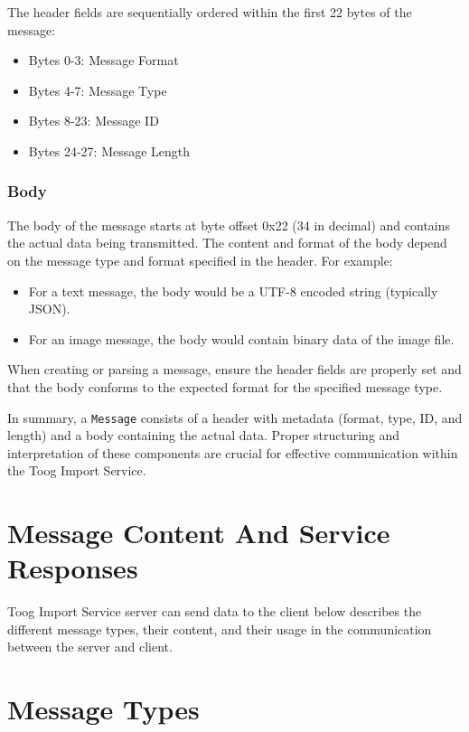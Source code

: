 \documentclass{memoir}
\begin{document}
	The header fields are sequentially ordered within the first 22 bytes of the message:
	\begin{itemize}
		\item Bytes 0-3: Message Format
		\item Bytes 4-7: Message Type
		\item Bytes 8-23: Message ID
		\item Bytes 24-27: Message Length
	\end{itemize}
	
	\subsubsection{Body}
	The body of the message starts at byte offset 0x22 (34 in decimal) and contains the actual data being transmitted. The content and format of the body depend on the message type and format specified in the header. For example:
	\begin{itemize}
		\item For a text message, the body would be a UTF-8 encoded string (typically JSON).
		\item For an image message, the body would contain binary data of the image file.
	\end{itemize}
	
	When creating or parsing a message, ensure the header fields are properly set and that the body conforms to the expected format for the specified message type.
	
	In summary, a \texttt{Message} consists of a header with metadata (format, type, ID, and length) and a body containing the actual data. Proper structuring and interpretation of these components are crucial for effective communication within the Toog Import Service.
	
	
	\section{Message Content And Service Responses}
 Toog Import Service server can send data to the client below describes the different message types, their content, and their usage in the communication between the server and client.
	
	\section{Message Types}
	
\end{document}
